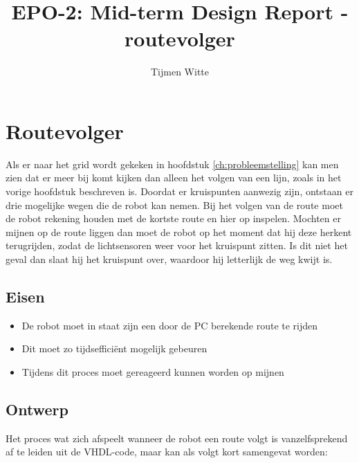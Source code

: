\documentclass{report}
\title{EPO-2: Mid-term Design Report - routevolger}
\author{Tijmen Witte}
\begin{document}
\chapter{Routevolger}
\label{ch:routevolger}

Als er naar het grid wordt gekeken in hoofdstuk \ref{ch:probleemstelling} kan men zien dat er meer bij komt kijken dan alleen het volgen van een lijn, zoals in het vorige hoofdstuk beschreven is.
Doordat er kruispunten aanwezig zijn, ontstaan er drie mogelijke wegen die de robot kan nemen.
Bij het volgen van de route moet de robot rekening houden met de kortste route en hier op inspelen.
Mochten er mijnen op de route liggen dan moet de robot op het moment dat hij deze herkent terugrijden, zodat de lichtsensoren weer voor het kruispunt zitten.
Is dit niet het geval dan slaat hij het kruispunt over, waardoor hij letterlijk de weg kwijt is.

\section{Eisen}
\begin{itemize}
	\item De robot moet in staat zijn een door de PC berekende route te rijden
	\item Dit moet zo tijdsefficiënt mogelijk gebeuren
	\item Tijdens dit proces moet gereageerd kunnen worden op mijnen
\end{itemize}

\section{Ontwerp}
Het proces wat zich afspeelt wanneer de robot een route volgt is vanzelfsprekend af te leiden uit de VHDL-code, maar kan als volgt kort samengevat worden:
\end{document}
